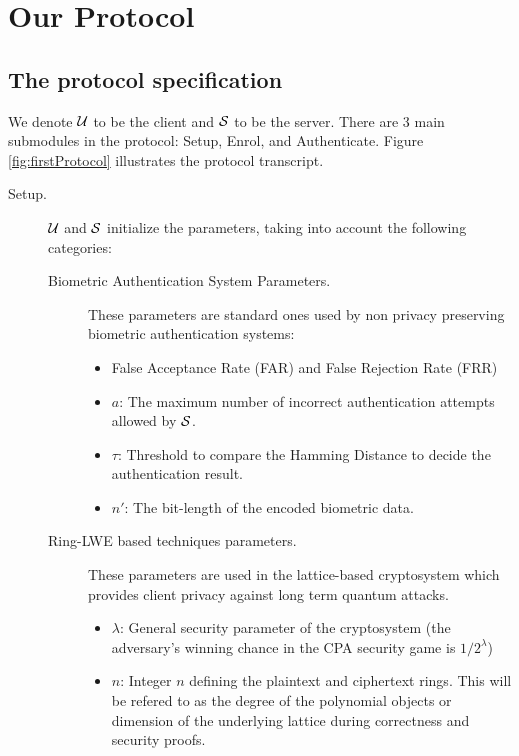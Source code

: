 \section{Our Protocol}
\label{sec:our_protocol}

\subsection{The protocol specification}
\label{sec:protocol1specs}

We denote $\mathcal{U}$ to be the client and $\mathcal{S}$ to be the server. There are 3
main submodules in the protocol: Setup, Enrol, and Authenticate. Figure \ref{fig:firstProtocol} illustrates the protocol transcript.
\begin{description}
\item[Setup.] $\mathcal{U}$ and $\mathcal{S}$ initialize the parameters, taking into account the following categories:
  \begin{description}
  \item[Biometric Authentication System Parameters.] These parameters are standard ones used by non privacy preserving
    biometric authentication systems:
    \begin{itemize}
    \item False Acceptance Rate (FAR) and False Rejection Rate (FRR)
    \item $a$: The maximum number of incorrect authentication attempts allowed by $\mathcal{S}$.
    \item $\tau$: Threshold to compare the Hamming Distance to decide the authentication result.
    \item \(n'\): The bit-length of the encoded
      biometric data.
    \end{itemize}
  \item[Ring-LWE based techniques parameters.] These parameters are used in the lattice-based cryptosystem which provides
    client privacy against long term quantum attacks.
    \begin{itemize}
    \item $\lambda$: General security parameter of the cryptosystem (the adversary's winning chance in the CPA security game is \(1/2^{\lambda}\))
    \item $n$: Integer $n$ defining the plaintext and ciphertext rings. This will be refered to as the degree of
      the polynomial objects or dimension of the underlying lattice during correctness and security proofs.

\end{itemize}
\end{description}
\end{description}
